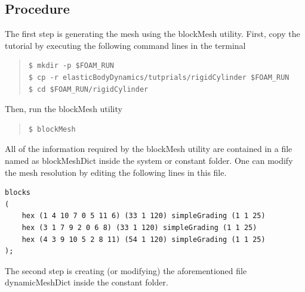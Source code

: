 \subsection{Procedure}

The first step is generating the mesh using the blockMesh utility. First, copy the tutorial by executing the following command lines in the terminal

\begin{quote}
\begin{verbatim}
$ mkdir -p $FOAM_RUN
$ cp -r elasticBodyDynamics/tutprials/rigidCylinder $FOAM_RUN
$ cd $FOAM_RUN/rigidCylinder
\end{verbatim}
\end{quote}

\noindent Then, run the blockMesh utility

\begin{quote}
\begin{verbatim}
$ blockMesh
\end{verbatim}
\end{quote}

\noindent All of the information required by the blockMesh utility are contained in a file named as blockMeshDict inside the system or constant folder. One can modify the mesh resolution by editing the following lines in this file.

\begin{lstlisting}
blocks
(
    hex (1 4 10 7 0 5 11 6) (33 1 120) simpleGrading (1 1 25)
    hex (3 1 7 9 2 0 6 8) (33 1 120) simpleGrading (1 1 25)
    hex (4 3 9 10 5 2 8 11) (54 1 120) simpleGrading (1 1 25)
);
\end{lstlisting}

The second step is creating (or modifying) the aforementioned file dynamicMeshDict inside the constant folder.

